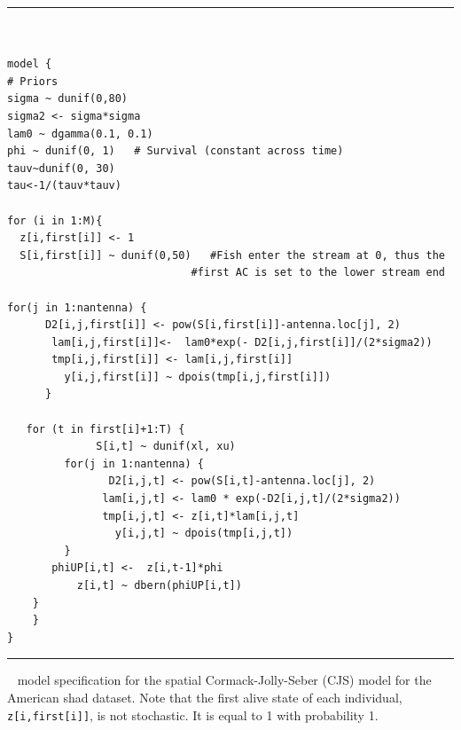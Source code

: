 \begin{panel}[htp]
\centering
\rule[0.1in]{\textwidth}{.03in}
{\small
\begin{verbatim}


model {
# Priors
sigma ~ dunif(0,80)
sigma2 <- sigma*sigma
lam0 ~ dgamma(0.1, 0.1)
phi ~ dunif(0, 1)   # Survival (constant across time)
tauv~dunif(0, 30)
tau<-1/(tauv*tauv)

for (i in 1:M){
  z[i,first[i]] <- 1
  S[i,first[i]] ~ dunif(0,50)   #Fish enter the stream at 0, thus the
			                 #first AC is set to the lower stream end

for(j in 1:nantenna) {
	  D2[i,j,first[i]] <- pow(S[i,first[i]]-antenna.loc[j], 2)
       lam[i,j,first[i]]<-  lam0*exp(- D2[i,j,first[i]]/(2*sigma2))
       tmp[i,j,first[i]] <- lam[i,j,first[i]]
         y[i,j,first[i]] ~ dpois(tmp[i,j,first[i]])
      }

   for (t in first[i]+1:T) {
	          S[i,t] ~ dunif(xl, xu) 
         for(j in 1:nantenna) {
		        D2[i,j,t] <- pow(S[i,t]-antenna.loc[j], 2)
               lam[i,j,t] <- lam0 * exp(-D2[i,j,t]/(2*sigma2))
	           tmp[i,j,t] <- z[i,t]*lam[i,j,t]
		         y[i,j,t] ~ dpois(tmp[i,j,t])
		 }
 	   phiUP[i,t] <-  z[i,t-1]*phi
	       z[i,t] ~ dbern(phiUP[i,t])
	}
	}
}
\end{verbatim}
}
\rule[-0.1in]{\textwidth}{.03in}
\caption{
\jags~ model specification for the spatial
Cormack-Jolly-Seber (CJS) model for the American shad dataset. Note that the first alive state of
each individual, \mbox{\tt z[i,first[i]]}, is not stochastic. It is
equal to 1 with probability 1.}
\label{open.panel.spatialCJS}
\end{panel}







